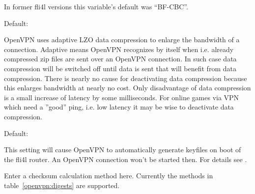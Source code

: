 \begin{description}
  In former fli4l versions this variable's default was ``BF-CBC''.


  Default: 

  OpenVPN uses adaptive LZO data compression to enlarge the bandwidth 
  of a connection. Adaptive means OpenVPN recognizes by itself when i.e. 
  already compressed zip files are sent over an OpenVPN connection. In 
  such case data compression will be switched off until data is sent that 
  will benefit from data compression. There is nearly no cause for 
  deactivating data compression because this enlarges bandwidth at nearly 
  no cost. Only disadvantage of data compression is a small increase of 
  latency by some milliseconds. For online games via VPN which need 
  a ''good'' ping, i.e. low latency it may be wise to deactivate 
  data compression. 
  

  Default: 

  This setting will cause OpenVPN to automatically generate keyfiles on 
  boot of the fli4l router. An OpenVPN connection won't be started then. 
  For details see .


  Enter a checksum calculation method here. Currently
  the methods in table~\ref{openvpn:digests} are supported.


\end{description}
